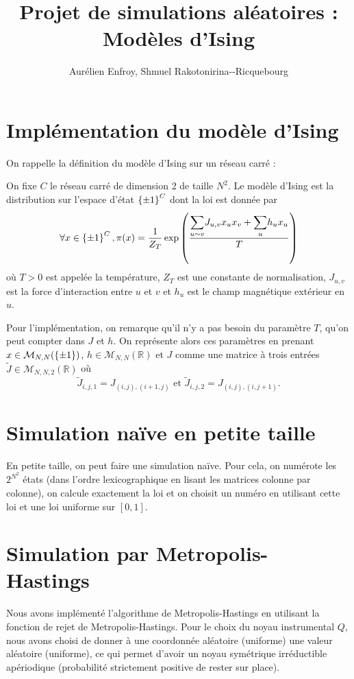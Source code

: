 \documentclass[a4paper,11pt]{article}
\title{Projet de simulations aléatoires : Modèles d'Ising}
\author{Aurélien Enfroy, Shmuel Rakotonirina{-}-Ricquebourg}
\begin{document}
\maketitle

\section{Implémentation du modèle d'Ising}

On rappelle la définition du modèle d'Ising sur un réseau carré :
\begin{definition}
On fixe $C$ le réseau carré de dimension 2 de taille $N^2$. Le modèle d'Ising est la distribution sur l'espace d'état $\left\lbrace \pm 1 \right\rbrace^C$ dont la loi est donnée par
$$\forall x \in \left\lbrace \pm 1 \right\rbrace^C, \pi(x) = \frac{1}{Z_T} \exp \left( \frac{\displaystyle{\sum_{u\sim v}^{}} J_{u,v} x_{u} x_{v} + \displaystyle{\sum_{u}^{}} h_{u} x_{u}}{T} \right)$$
où $T>0$ est appelée la température, $Z_T$ est une constante de normalisation, $J_{u,v}$ est la force d'interaction entre $u$ et $v$ et $h_{u}$ est le champ magnétique extérieur en $u$.
\end{definition}

Pour l'implémentation, on remarque qu'il n'y a pas besoin du paramètre $T$, qu'on peut compter dans $J$ et $h$. On représente alors ces paramètres en prenant $x \in \mathcal M_{N,N}(\left\lbrace \pm 1 \right\rbrace)$, $h \in \mathcal M_{N,N}(\mathbb R)$ et $J$ comme une matrice à trois entrées $\tilde J \in \mathcal M_{N,N,2}(\mathbb R)$ où
$$\tilde J_{i,j,1} = J_{(i,j),(i+1,j)} \text{ et } \tilde J_{i,j,2} = J_{(i,j),(i,j+1)}.$$

\section{Simulation naïve en petite taille}

En petite taille, on peut faire une simulation naïve. Pour cela, on numérote les $2^{N^2}$ états (dans l'ordre lexicographique en lisant les matrices colonne par colonne), on calcule exactement la loi et on choisit un numéro en utilisant cette loi et une loi uniforme sur $[0,1]$.

\section{Simulation par Metropolis-Hastings}\label{sec:MH}

Nous avons implémenté l'algorithme de Metropolis-Hastings en utilisant la fonction de rejet de Metropolis-Hastings. Pour le choix du noyau instrumental $Q$, nous avons choisi de donner à une coordonnée aléatoire (uniforme) une valeur aléatoire (uniforme), ce qui permet d'avoir un noyau symétrique irréductible apériodique (probabilité strictement positive de rester sur place).
\end{document}
